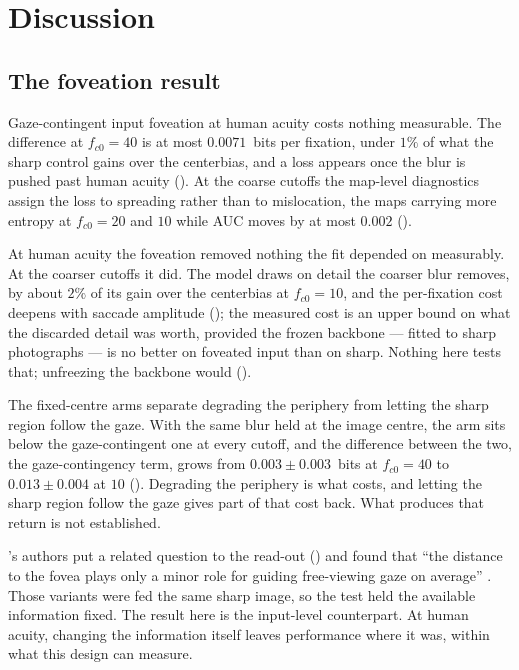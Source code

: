 \chapter{Discussion}
\label{ch:discussion}

\section{The foveation result}
\label{sec:disc-finding}

Gaze-contingent input foveation at human acuity costs nothing measurable. The difference at
$f_{c0} = 40$ is at most $0.0071$~bits per fixation, under $1\%$ of what the sharp control gains over the
centerbias, and a loss appears once the blur is pushed past human acuity (). At
the coarse cutoffs the map-level diagnostics assign the loss to spreading rather than to mislocation, the
maps carrying more entropy at $f_{c0} = 20$ and $10$ while AUC moves by at most $0.002$
().

At human acuity the foveation removed nothing the fit depended on measurably. At the coarser cutoffs it
did. The model draws on detail the coarser blur removes, by about $2\%$ of its gain over the centerbias at
$f_{c0} = 10$, and the per-fixation cost deepens with saccade amplitude (); the measured cost is an
upper bound on what the discarded detail was worth, provided the frozen backbone --- fitted to sharp
photographs --- is no better on foveated input than on sharp. Nothing here tests that; unfreezing the
backbone would ().

The fixed-centre arms separate degrading the periphery from letting the sharp region follow the gaze.
With the same blur held at the image centre, the arm sits below the gaze-contingent one at every cutoff,
and the difference between the two, the gaze-contingency term, grows from $0.003 \pm 0.003$~bits at
$f_{c0} = 40$ to $0.013 \pm 0.004$ at $10$ (). Degrading the periphery is what costs, and letting the sharp
region follow the gaze gives part of that cost back. What produces that return is not established.

\dg{}'s authors put a related question to the read-out () and found that \enquote{the
distance to the fovea plays only a minor role for guiding free-viewing gaze on average}
\citep{kummerer2022deepgaze3}. Those variants were fed the same
sharp image, so the test held the available information fixed. The result here is the input-level
counterpart. At human acuity, changing the information itself leaves performance where it was, within
what this design can measure.

